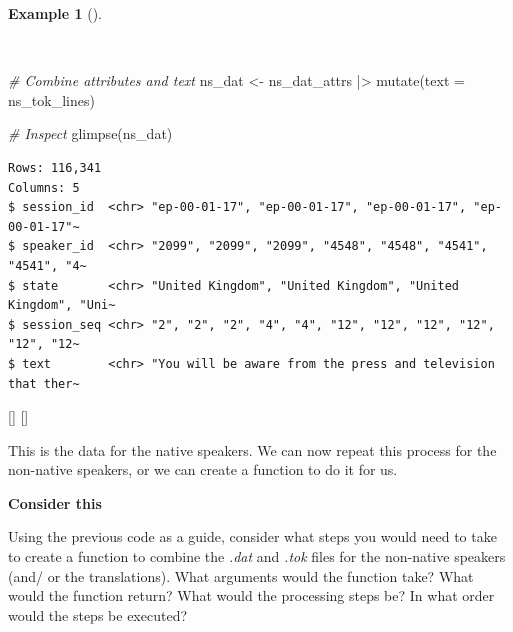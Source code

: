 \documentclass[
  letterpaper,
  krantz1]{latex/krantz-mod}
\newenvironment{Shaded}{\begin{snugshade}}{\end{snugshade}}
\newcommand{\AttributeTok}[1]{\textcolor[rgb]{0.00,0.00,0.00}{#1}}
\newcommand{\CommentTok}[1]{\textcolor[rgb]{0.00,0.00,0.00}{\textit{#1}}}
\newcommand{\FunctionTok}[1]{\textcolor[rgb]{0.00,0.00,0.00}{#1}}
\newcommand{\NormalTok}[1]{\textcolor[rgb]{0.00,0.00,0.00}{#1}}
\newcommand{\OtherTok}[1]{\textcolor[rgb]{0.00,0.00,0.00}{#1}}
\newcommand{\SpecialCharTok}[1]{\textcolor[rgb]{0.00,0.00,0.00}{#1}}
\newcommand{\cindex}[1]{%
  \StrSubstitute{#1}{_}{\_}[\temp]%
  \index{\temp}%
}
\theoremstyle{definition}
\theoremstyle{definition}
\newtheorem{example}{Example}[chapter]
\theoremstyle{remark}
\begin{document}
\begin{example}[]\protect\hypertarget{exm-curate-enntt-combine-attributes-text}{}\label{exm-curate-enntt-combine-attributes-text}

~

\begin{Shaded}
\begin{Highlighting}[numbers=left,,]
\CommentTok{\# Combine attributes and text}
\NormalTok{ns\_dat }\OtherTok{\textless{}{-}}
\NormalTok{  ns\_dat\_attrs }\SpecialCharTok{|\textgreater{}}
  \FunctionTok{mutate}\NormalTok{(}\AttributeTok{text =}\NormalTok{ ns\_tok\_lines)}

\CommentTok{\# Inspect}
\FunctionTok{glimpse}\NormalTok{(ns\_dat)}
\end{Highlighting}
\end{Shaded}

\begin{verbatim}
Rows: 116,341
Columns: 5
$ session_id  <chr> "ep-00-01-17", "ep-00-01-17", "ep-00-01-17", "ep-00-01-17"~
$ speaker_id  <chr> "2099", "2099", "2099", "4548", "4548", "4541", "4541", "4~
$ state       <chr> "United Kingdom", "United Kingdom", "United Kingdom", "Uni~
$ session_seq <chr> "2", "2", "2", "4", "4", "12", "12", "12", "12", "12", "12~
$ text        <chr> "You will be aware from the press and television that ther~
\end{verbatim}

\cindex{mutate()}\cindex{glimpse()}

\end{example}

This is the data for the native speakers. We can now repeat this process
for the non-native speakers, or we can create a function to do it for
us.

\pagebreak

\begin{tcolorbox}[enhanced jigsaw, toprule=.15mm, breakable, colback=white, arc=.35mm, left=2mm, colframe=quarto-callout-color-frame, opacityback=0, bottomrule=.15mm, rightrule=.15mm, leftrule=.75mm]

\textbf{ Consider this}

Using the previous code as a guide, consider what steps you would need
to take to create a function to combine the \emph{.dat} and \emph{.tok}
files for the non-native speakers (and/ or the translations). What
arguments would the function take? What would the function return? What
would the processing steps be? In what order would the steps be
executed?

\end{tcolorbox}
\end{document}
